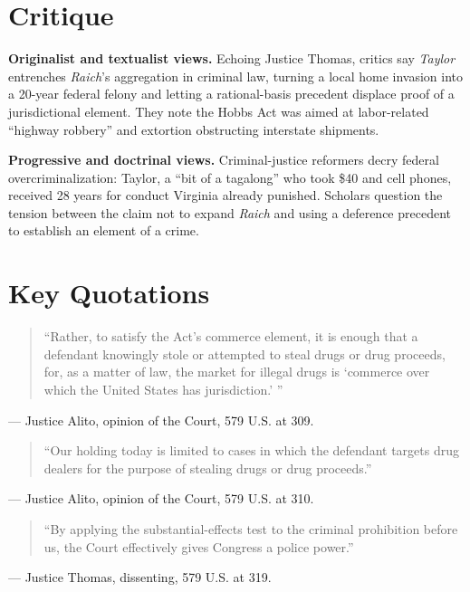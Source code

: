 \documentclass[12pt]{article}
\begin{document}
\section{Critique}

\textbf{Originalist and textualist views.} Echoing Justice Thomas, critics say \textit{Taylor} entrenches \textit{Raich}'s aggregation in criminal law, turning a local home invasion into a 20-year federal felony and letting a rational-basis precedent displace proof of a jurisdictional element. They note the Hobbs Act was aimed at labor-related ``highway robbery'' and extortion obstructing interstate shipments.

\textbf{Progressive and doctrinal views.} Criminal-justice reformers decry federal overcriminalization: Taylor, a ``bit of a tagalong'' who took \$40 and cell phones, received 28 years for conduct Virginia already punished. Scholars question the tension between the claim not to expand \textit{Raich} and using a deference precedent to establish an element of a crime.

\section{Key Quotations}

\begin{quote}
``Rather, to satisfy the Act's commerce element, it is enough that a defendant knowingly stole or attempted to steal drugs or drug proceeds, for, as a matter of law, the market for illegal drugs is `commerce over which the United States has jurisdiction.' ''
\end{quote}
\noindent --- Justice Alito, opinion of the Court, 579 U.S. at 309.

\begin{quote}
``Our holding today is limited to cases in which the defendant targets drug dealers for the purpose of stealing drugs or drug proceeds.''
\end{quote}
\noindent --- Justice Alito, opinion of the Court, 579 U.S. at 310.

\begin{quote}
``By applying the substantial-effects test to the criminal prohibition before us, the Court effectively gives Congress a police power.''
\end{quote}
\noindent --- Justice Thomas, dissenting, 579 U.S. at 319.
\end{document}

